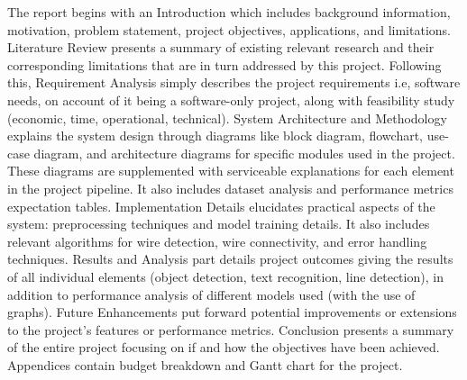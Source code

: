 The report begins with an Introduction which includes background information, motivation, problem statement, project objectives, applications, and limitations. Literature Review presents a summary of existing relevant research and their corresponding limitations that are in turn addressed by this project. Following this, Requirement Analysis simply describes the project requirements i.e, software needs, on account of it being a software-only project, along with feasibility study (economic, time, operational, technical). System Architecture and Methodology explains the system design through diagrams like block diagram, flowchart, use-case diagram, and architecture diagrams for specific modules used in the project. These diagrams are supplemented with serviceable explanations for each element in the project pipeline. It also includes dataset analysis and performance metrics expectation tables. Implementation Details elucidates practical aspects of the system: preprocessing techniques and model training details. It also includes relevant algorithms for wire detection, wire connectivity, and error handling techniques. Results and Analysis part details project outcomes giving the results of all individual elements (object detection, text recognition, line detection), in addition to performance analysis of different models used (with the use of graphs). Future Enhancements put forward potential improvements or extensions to the project's features or performance metrics. Conclusion presents a summary of the entire project focusing on if and how the objectives have been achieved. Appendices  contain budget breakdown and Gantt chart for the project.